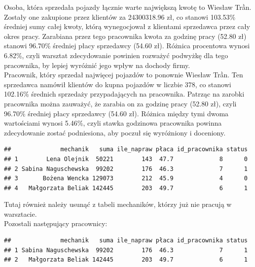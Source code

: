 \documentclass{article}\usepackage[]{graphicx}\usepackage[]{xcolor}
\makeatletter
\newenvironment{kframe}{%
 \def\at@end@of@kframe{}%
 \ifinner\ifhmode%
  \def\at@end@of@kframe{\end{minipage}}%
  \begin{minipage}{\columnwidth}%
 \fi\fi%
 \def\FrameCommand##1{\hskip\@totalleftmargin \hskip-\fboxsep
 \colorbox{shadecolor}{##1}\hskip-\fboxsep
     \hskip-\linewidth \hskip-\@totalleftmargin \hskip\columnwidth}%
 \MakeFramed {\advance\hsize-\width
   \@totalleftmargin\z@ \linewidth\hsize
   \@setminipage}}%
 {\par\unskip\endMakeFramed%
 \at@end@of@kframe}
\newenvironment{knitrout}{}{} %
\makeatother
\begin{document}
Osoba, która sprzedała pojazdy łącznie warte największą kwotę to Wiesław Trần. Zostały one zakupione przez klientów za 24300318.96 zł, co stanowi 103.53\% średniej sumy całej kwoty, którą wynegocjował z klientami sprzedawca przez cały okres pracy. Zarabiana przez tego pracownika kwota za godzinę pracy (52.80 zł) stanowi 96.70\% średniej płacy sprzedawcy (54.60 zł). Różnica procentowa wynosi 6.82\%, czyli warsztat zdecydowanie powinien rozważyć podwyżkę dla tego pracownika, by lepiej wyróżnić jego wpływ na dochody firmy. \\

Pracownik, który sprzedał najwięcej pojazdów to ponownie Wiesław Trần. Ten sprzedawca namówił klientów do kupna pojazdów w liczbie 378, co stanowi 102.16\% średnich sprzedaży przypadających na pracownika. Patrząc na zarobki pracownika można zauważyć, że zarabia on za godzinę pracy (52.80 zł), czyli 96.70\% średniej płacy sprzedawcy (54.60 zł). Różnica między tymi dwoma wartościami wynosi 5.46\%, czyli stawka godzinowa pracownika powinna zdecydowanie zostać podniesiona, aby poczuł się wyróżniony i doceniony. 

\begin{knitrout}
\color{fgcolor}\begin{kframe}
\begin{verbatim}
##              mechanik   suma ile_napraw płaca id_pracownika status
## 1        Lena Olejnik  50221        143  47.7             8      0
## 2 Sabina Naguschewska  99202        176  46.3             7      1
## 3       Bożena Wencka 129073        212  45.9             4      0
## 4   Małgorzata Beliak 142445        203  49.7             6      1
\end{verbatim}
\end{kframe}
\end{knitrout}


Tutaj również należy usunąć z tabeli mechaników, którzy już nie pracują w warsztacie. \\

Pozostali następujący pracownicy:

\begin{knitrout}
\color{fgcolor}\begin{kframe}
\begin{verbatim}
##              mechanik   suma ile_napraw płaca id_pracownika status
## 1 Sabina Naguschewska  99202        176  46.3             7      1
## 2   Małgorzata Beliak 142445        203  49.7             6      1
\end{verbatim}
\end{kframe}
\end{knitrout}
\end{document}
